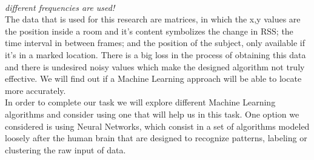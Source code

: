 \documentclass[conference]{IEEEtran}
\begin{document}
\\
\textit{different frequencies are used!}\\
The data that is used for this research are matrices, in which the x,y values are the position inside a room and it's content symbolizes the change in RSS; the time interval in between frames; and the position of the subject, only available if it's in a marked location. There is a big loss in the process of obtaining this data and there is undesired noisy values which make the designed algorithm not truly effective. We will find out if a Machine Learning approach will be able to locate more accurately.\\
In order to complete our task we will explore different Machine Learning algorithms and consider using one that will help us in this task. One option we considered is using Neural Networks, which consist in a set of algorithms modeled loosely after the human brain that are designed to recognize patterns, labeling or clustering the raw input of data.

\end{document}
